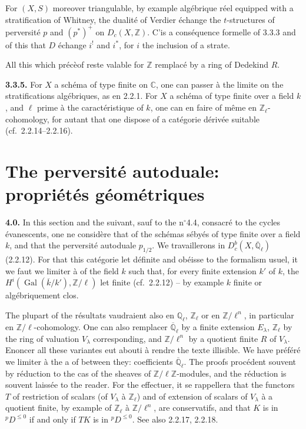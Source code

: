 \documentclass[12pt,a4paper]{article}
\theoremstyle{plain}
\theoremstyle{definition}
\DeclareMathOperator{\Gal}{Gal}
\providecommand{\Gal}{\operatorname{Gal}}
\begin{document}
For $(X,S)$ moreover triangulable, by example alg\'{e}brique r\'{e}el equipped with a stratification of Whitney, the dualit\'{e} of Verdier \'{e}change the $t$-structures of perversit\'{e} $p$ and $(p^{*})^{+}$ on $D_{c}(X,\mathbb{Z})$. C'is a cons\'{e}quence formelle of 3.3.3 and of this that $D$ \'{e}change $i^{!}$ and $i^{*}$, for $i$ the inclusion of a strate.

All this which pr\'{e}c\`{e}of reste valable for $\mathbb{Z}$ remplac\'{e} by a ring of Dedekind $R$.

\noindent\textbf{3.3.5.} For $X$ a sch\'{e}ma of type finite on $\mathbb{C}$, one can passer \`{a} the limite on the stratifications alg\'{e}briques, as en 2.2.1. For $X$ a sch\'{e}ma of type finite over a field $k$, and $\ell$ prime \`{a} the caract\'{e}ristique of $k$, one can en faire of m\^{e}me en $\mathbb{Z}_{\ell}$-cohomology, for autant that one dispose of a cat\'{e}gorie d\'{e}riv\'{e}e suitable (cf.\ 2.2.14--2.2.16).


\section{The perversit\'{e} autoduale: propri\'{e}t\'{e}s g\'{e}om\'{e}triques}

\noindent\textbf{4.0.} In this section and the suivant, sauf to the n$^{\circ}$4.4, consacr\'{e} to the cycles \'{e}vanescents, one ne consid\`{e}re that of the sch\'{e}mas s\'{e}by\'{e}s of type finite over a field $k$, and that the perversit\'{e} autoduale $p_{1/2}$. We travaillerons in $D_{c}^{b}(X,\overline{\mathbb{Q}}_{\ell})$ (2.2.12). For that this cat\'{e}gorie let d\'{e}finite and ob\'{e}isse to the formalism usuel, it we faut we limiter \`{a} of the field $k$ such that, for every finite extension $k'$ of $k$, the $H^{i}(\Gal(\overline{k}/k'), \mathbb{Z}/\ell)$ let finite (cf.\ 2.2.12) -- by example $k$ finite or alg\'{e}briquement clos.

The plupart of the r\'{e}sultats vaudraient also en $\mathbb{Q}_{\ell}$, $\mathbb{Z}_{\ell}$ or en $\mathbb{Z}/\ell^{n}$, in particular en $\mathbb{Z}/\ell$-cohomology. One can also remplacer $\overline{\mathbb{Q}}_{\ell}$ by a finite extension $E_{\lambda}$, $\mathbb{Z}_{\ell}$ by the ring of valuation $V_{\lambda}$ corresponding, and $\mathbb{Z}/\ell^{n}$ by a quotient finite $R$ of $V_{\lambda}$. Enoncer all these variantes eut abouti \`{a} rendre the texte illisible. We have pr\'{e}f\'{e}r\'{e} we limiter \`{a} the a of between they: coefficients $\overline{\mathbb{Q}}_{\ell}$. The proofs proc\'{e}dent souvent by r\'{e}duction to the cas of the sheaves of $\mathbb{Z}/\ell\mathbb{Z}$-modules, and the r\'{e}duction is souvent laiss\'{e}e to the reader. For the effectuer, it se rappellera that the functors $T$ of restriction of scalars (of $V_{\lambda}$ \`{a} $\mathbb{Z}_{\ell}$) and of extension of scalars of $V_{\lambda}$ \`{a} a quotient finite, by example of $\mathbb{Z}_{\ell}$ \`{a} $\mathbb{Z}/\ell^{n}$, are conservatifs, and that $K$ is in ${}^{p}D^{\leq 0}$ if and only if $TK$ is in ${}^{p}D^{\leq 0}$. See also 2.2.17, 2.2.18.
\end{document}

